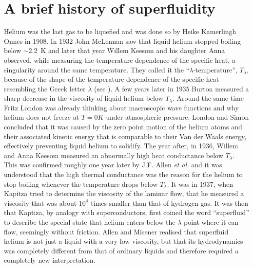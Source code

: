 	\section{A brief history of superfluidity}
		Helium was the last gas to be liquefied and was done so by Heike Kamerlingh Onnes in 1908\citep{Onnes1908,Onnes1909}. In 1932 John McLennan saw that liquid helium stopped boiling below $\sim$2.2~K\citep{McLennan1932} and later that year Willem Keesom and his daughter Anna observed, while measuring the temperature dependence of the specific heat, a singularity around the same temperature\citep{Keesom1932}. They called it the ``$\lambda$-temperature'',  $T_\lambda$, because of the shape of the temperature dependence of the specific heat resembling the Greek letter $\lambda$ (see ). A few years later in 1935 Burton measured a sharp decrease in the viscosity of liquid helium below $T_\lambda$\citep{Burton1935}. Around the same time Fritz London was already thinking about macroscopic wave functions and why helium does not freeze at $T=0\unit{K}$ under atmospheric pressure\citep{London1935}. London and Simon concluded that it was caused by the zero point motion of the helium atoms and their associated kinetic energy that is comparable to their Van der Waals energy, effectively preventing liquid helium to solidify\citep{Simon1934,London1936}. The year after, in 1936, Willem and Anna Keesom measured an abnormally high heat conductance below $T_\lambda$\citep{Keesom1936}. This was confirmed roughly one year later by J.F. Allen \emph{et al.}\citep{Allen1937} and it was understood that the high thermal conductance was the reason for the helium to stop boiling whenever the temperature drops below $T_\lambda$. It was in 1937, when Kapitza tried to determine the viscosity of the laminar flow, that he measured a viscosity that was about $10^4$ times smaller than that of hydrogen gas\citep{Kapitza1938}. It was then that Kaptiza, by analogy with superconductors, first coined the word ``superfluid''\citep{Kapitza1938} to describe the special state that helium enters below the $\lambda$-point where it can flow, seemingly without friction. Allen and Misener realised that superfluid helium is not just a liquid with a very low viscosity, but that its hydrodynamics was completely different from that of ordinary liquids\citep{Allen1938} and therefore required a completely new interpretation.

